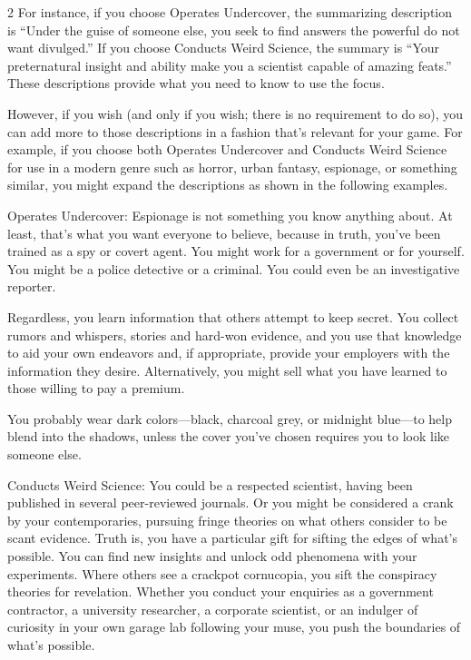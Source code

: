 \begin{multicols}{2}
For instance, if you choose Operates Undercover, the summarizing description is “Under the guise of someone else, you seek to find answers the powerful do not want divulged.” If you choose Conducts Weird Science, the summary is “Your preternatural insight and ability make you a scientist capable of amazing feats.” These descriptions provide what you need to know to use the focus. 

However, if you wish (and only if you wish; there is no requirement to do so), you can add more to those descriptions in a fashion that’s relevant for your game. For example, if you choose both Operates Undercover and Conducts Weird Science for use in a modern genre such as horror, urban fantasy, espionage, or something similar, you might expand the descriptions as shown in the following examples.

Operates Undercover: Espionage is not something you know anything about. At least, that’s what you want everyone to believe, because in truth, you’ve been trained as a spy or covert agent. You might work for a government or for yourself. You might be a police detective or a criminal. You could even be an investigative reporter.

Regardless, you learn information that others attempt to keep secret. You collect rumors and whispers, stories and hard-won evidence, and you use that knowledge to aid your own endeavors and, if appropriate, provide your employers with the information they desire. Alternatively, you might sell what you have learned to those willing to pay a premium.

You probably wear dark colors—black, charcoal grey, or midnight blue—to help blend into the shadows, unless the cover you’ve chosen requires you to look like someone else.

Conducts Weird Science: You could be a respected scientist, having been published in several peer-reviewed journals. Or you might be considered a crank by your contemporaries, pursuing fringe theories on what others consider to be scant evidence. Truth is, you have a particular gift for sifting the edges of what’s possible. You can find new insights and unlock odd phenomena with your experiments. Where others see a crackpot cornucopia, you sift the conspiracy theories for revelation. Whether you conduct your enquiries as a government contractor, a university researcher, a corporate scientist, or an indulger of curiosity in your own garage lab following your muse, you push the boundaries of what’s possible.


\end{multicols}
